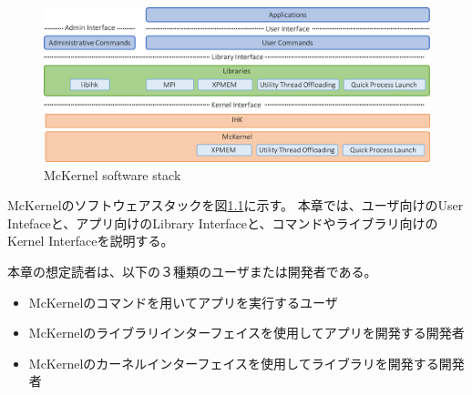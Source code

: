 \documentclass[twoside,11pt,fleqn]{book}
\begin{document}
\tableofcontents
\listoffigures   
\listoftables   

\linenumbers

\chapter{}
%
\begin{figure}[!htb]
\centering
\includegraphics[width=0.9\linewidth]{figs/soft_stack.pdf}
\vspace{-0em}\caption{McKernel software stack}
\label{fig:soft_stack}
\vspace{-0em}
\end{figure}
\FloatBarrier
%
McKernelのソフトウェアスタックを図\ref{fig:soft_stack}に示す。
本章では、ユーザ向けのUser Intefaceと、アプリ向けのLibrary Interfaceと、コマンドやライブラリ向けのKernel Interfaceを説明する。

本章の想定読者は、以下の３種類のユーザまたは開発者である。
\begin{itemize}
\item McKernelのコマンドを用いてアプリを実行するユーザ
\item McKernelのライブラリインターフェイスを使用してアプリを開発する開発者
\item McKernelのカーネルインターフェイスを使用してライブラリを開発する開発者
\end{itemize}
\end{document}
